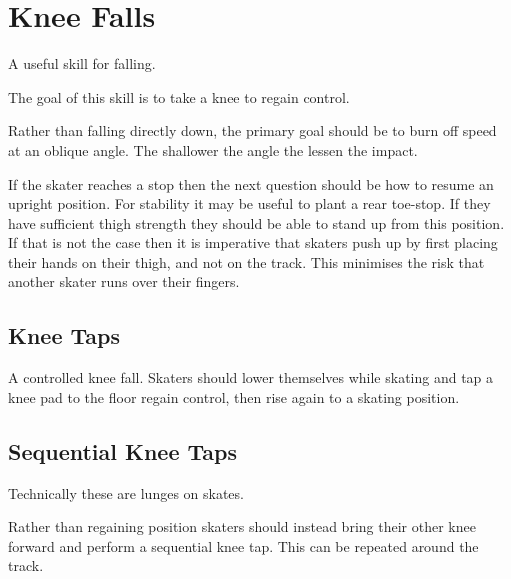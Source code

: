 \section{Knee Falls}
\label{sec:falls/knee_falls}

A useful skill for falling.

The goal of this skill is to take a knee to regain control. 

Rather than falling directly down, the primary goal should be to burn off speed at an oblique angle. 
The shallower the angle the lessen the impact. 


If the skater reaches a stop then the next question should be how to resume an upright position. 
For stability it may be useful to plant a rear toe-stop.
If they have sufficient thigh strength they should be able to stand up from this position. 
If that is not the case then it is imperative that skaters push up by first placing their hands on their thigh, and not on the track.  
This minimises the risk that another skater runs over their fingers.



\subsection*{Knee Taps}
A controlled knee fall.
Skaters should lower themselves while skating and tap a knee pad to the floor regain control, then rise again to a skating position.  



\subsection*{Sequential Knee Taps}
Technically these are lunges on skates.

Rather than regaining position skaters should instead bring their other knee forward and perform a sequential knee tap.   
This can be repeated around the track.
